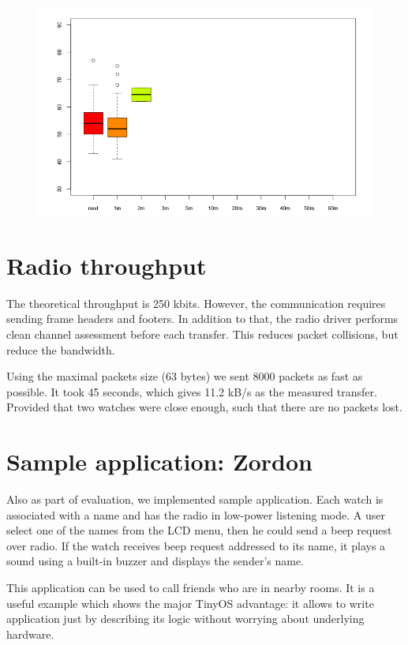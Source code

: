 \begin{figure}[H]
  \centering
  \includegraphics[width=1.0\textwidth]{img/tests/lqi/db_m30.png}
\end{figure}


\section{Radio throughput}

The theoretical throughput is 250 kbits.
However, the communication requires sending frame headers and footers.
In addition to that, the radio driver performs clean channel assessment before each transfer.
This reduces packet collisions, but reduce the bandwidth.

Using the maximal packets size (63 bytes) we sent 8000 packets as fast as possible.
It took 45 seconds, which gives 11.2 kB/s as the measured transfer.
Provided that two watches were close enough, such that there are no packets lost.


\section{Sample application: Zordon}

Also as part of evaluation, we implemented sample application.
Each watch is associated with a name and has the radio in low-power listening mode.
A user select one of the names from the LCD menu, then he could send a beep request over radio.
If the watch receives beep request addressed to its name, it plays a sound using a built-in buzzer and displays the sender's name.

This application can be used to call friends who are in nearby rooms.
It is a useful example which shows the major TinyOS advantage: it allows to write application just by describing its logic without worrying about underlying hardware.






